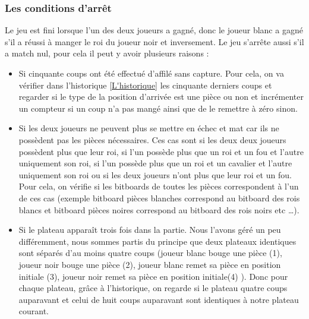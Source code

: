 \huge\documentclass{article}
\begin{document}
    \subsubsection{Les conditions d'arrêt} \label{Architecture_condition_d'arrêt}
    Le jeu est fini lorsque l'un des deux joueurs a gagné, donc le joueur blanc a gagné s'il a réussi à manger le roi du joueur noir et inversement.\newline
    Le jeu s'arrête aussi s'il a match nul, pour cela il peut y avoir plusieurs raisons :
    \begin{itemize}
        \item Si cinquante coups ont été effectué d'affilé sans capture.\newline
        Pour cela, on va vérifier dans l'historique \ref{L'historique} les cinquante derniers coups et regarder si le type de la position d'arrivée est une pièce ou non et incrémenter un compteur si un coup n'a pas mangé ainsi que de le remettre à zéro sinon.
        \item Si les deux joueurs ne peuvent plus se mettre en échec et mat car ils ne possèdent pas les pièces nécessaires.\newline
        Ces cas sont si les deux deux joueurs possèdent plus que leur roi, si l'un possède plus que un roi et un fou et l'autre uniquement son roi, si l'un possède plus que un roi et un cavalier et l'autre uniquement son roi ou si les deux joueurs n'ont plus que leur roi et un fou.\newline
        Pour cela, on vérifie si les bitboards de toutes les pièces correspondent à l'un de ces cas (exemple bitboard pièces blanches correspond au bitboard des rois blancs et bitboard pièces noires correspond au bitboard des rois noirs etc \dots).
        \item Si le plateau apparaît trois fois dans la partie.\newline
        Nous l'avons géré un peu différemment, nous sommes partis du principe que deux plateaux identiques sont séparés d'au moins quatre coups (joueur blanc bouge une pièce (1), joueur noir bouge une pièce (2), joueur blanc remet sa pièce en position initiale (3), joueur noir remet sa pièce en position initiale(4) ).\newline
        Donc pour chaque plateau, grâce à l'historique, on regarde si le plateau quatre coups auparavant et celui de huit coups auparavant sont identiques à notre plateau courant.
    \end{itemize}
\end{document}
